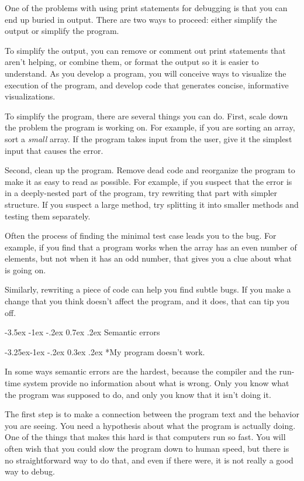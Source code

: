 \documentclass{book}
\makeatletter
\renewcommand{\section}{\@startsection 
    {section} {1} {0mm}%
    {-3.5ex \@plus -1ex \@minus -.2ex}%
    {0.7ex \@plus.2ex}%
    {\normalfont\Large\bfseries}}
\renewcommand\subsection{\@startsection {subsection}{2}{0mm}%
    {-3.25ex\@plus -1ex \@minus -.2ex}%
    {0.3ex \@plus .2ex}%
    {\normalfont\large\bfseries}}
\makeatother
\begin{document}
One of the problems with using print statements for debugging
is that you can end up buried in output.  There are two ways
to proceed: either simplify the output or simplify the program.

To simplify the output, you can remove or comment out print
statements that aren't helping, or combine them, or format
the output so it is easier to understand.  As you develop a program,
you will conceive ways to visualize the execution of
the program, and develop code that generates concise,
informative visualizations.

To simplify the program, there are several things you can do.  First,
scale down the problem the program is working on.  For example, if you
are sorting an array, sort a {\em small} array.  If the program takes
input from the user, give it the simplest input that causes the
error.

Second, clean up the program.  Remove dead code and reorganize the
program to make it as easy to read as possible.  For example, if you
suspect that the error is in a deeply-nested part of the program,
try rewriting that part with simpler structure.  If you suspect a
large method, try splitting it into smaller methods and testing them
separately.

Often the process of finding the minimal test case leads you to the
bug.  For example, if you find that a program works when the array has
an even number of elements, but not when it has an odd number, that
gives you a clue about what is going on.

Similarly, rewriting a piece of code can help you find subtle
bugs.  If you make a change that you think doesn't affect the
program, and it does, that can tip you off.


\section{Semantic errors}

\subsection*{My program doesn't work.}

In some ways semantic errors are the hardest, because the
compiler and the run-time system provide no information about
what is wrong.  Only you know what the program was supposed to
do, and only you know that it isn't doing it.

The first step is to make a connection between the program
text and the behavior you are seeing.  You need a hypothesis
about what the program is actually doing.  One of the things
that makes this hard is that computers run so fast.
You will often wish that you could slow the program down to
human speed, but there is no straightforward way to do that,
and even if there were, it is not really a good way to debug.
\end{document}
